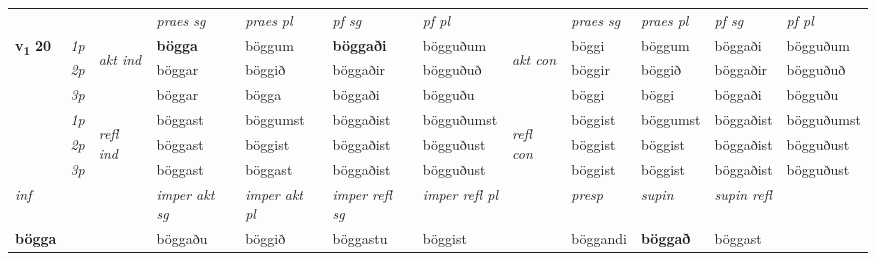 \begin{longtable}[l]{X>{\footnotesize\itshape}llXXXXlXXXX}
 & &   & \textit{praes sg}  & \textit{praes pl}    & \textit{ pf sg} & \textit{pf pl} & & \textit{praes sg}  & \textit{praes pl}    & \textit{pf sg} & \textit{pf pl }  \\ \cmidrule{4-7} \cmidrule{9-12}
 \multirow{2}{*}{{{\textbf{v{\textsubscript{1}}} \Large{\textbf{20}}}}}  & 1p & \multirow{3}{*}{\begin{turn}{90}\textit{akt ind}\end{turn}} & \textbf{bögga} & böggum & \textbf{böggaði} & bögguðum & \multirow{3}{*}{\begin{turn}{90}\textit{akt con}\end{turn}} &böggi & böggum & böggaði & bögguðum\\*
 & 2p &  &  böggar  & böggið & böggaðir & bögguðuð & & böggir & böggið & böggaðir & bögguðuð \\*
 & 3p &  & böggar & bögga & böggaði & bögguðu & & böggi & böggi& böggaði & bögguðu \\*
\cmidrule{4-7} \cmidrule{9-12}
 & 1p & \multirow{3}{*}{\begin{turn}{90}\textit{refl ind}\end{turn}}  & böggast & böggumst & böggaðist & bögguðumst & \multirow{3}{*}{\begin{turn}{90}\textit{refl con}\end{turn}}  &böggist & böggumst & böggaðist & bögguðumst \\*
 & 2p &  & böggast & böggist & böggaðist & bögguðust & &böggist & böggist & böggaðist & bögguðust \\*
 & 3p  & & böggast & böggast & böggaðist & bögguðust & & böggist & böggist& böggaðist & bögguðust \\*
\cmidrule{4-7} \cmidrule{9-12}

   {\textit{inf}} & &  & \textit{imper akt sg} & \textit{imper akt pl} & \textit{imper refl sg} & \textit{imper refl pl} && \textit{presp} & \textit{supin} & \textit{supin refl}  \\*
  {\textbf{bögga}} & && böggaðu  & böggið & böggastu & böggist && böggandi &  \textbf{böggað} & böggast  \\*

\midrule


\end{longtable}

